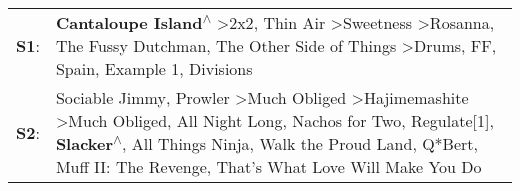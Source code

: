 \begin{supertabular}{p{0.03\textwidth}p{0.92\textwidth}}
 \textbf{S1}:  &                                                                                                                                  \textbf{Cantaloupe Island\textsuperscript{$\wedge$}} \textgreater \enspace 2x2\textsuperscript{}, \enspace Thin Air\textsuperscript{} \textgreater \enspace Sweetness\textsuperscript{} \textgreater \enspace Rosanna\textsuperscript{}, \enspace The Fussy Dutchman\textsuperscript{}, \enspace The Other Side of Things\textsuperscript{} \textgreater \enspace Drums\textsuperscript{}, \enspace FF\textsuperscript{}, \enspace Spain\textsuperscript{}, \enspace Example 1\textsuperscript{}, \enspace Divisions\textsuperscript{}  \enspace  \\
 \textbf{S2}:  &  Sociable Jimmy\textsuperscript{}, \enspace Prowler\textsuperscript{} \textgreater \enspace Much Obliged\textsuperscript{} \textgreater \enspace Hajimemashite\textsuperscript{} \textgreater \enspace Much Obliged\textsuperscript{}, \enspace All Night Long\textsuperscript{}, \enspace Nachos for Two\textsuperscript{}, \enspace Regulate[1]\textsuperscript{}, \enspace \textbf{Slacker\textsuperscript{$\wedge$}}, \enspace All Things Ninja\textsuperscript{}, \enspace Walk the Proud Land\textsuperscript{}, \enspace Q*Bert\textsuperscript{}, \enspace Muff II: The Revenge\textsuperscript{}, \enspace That's What Love Will Make You Do\textsuperscript{}  \enspace  \\
\end{supertabular}
